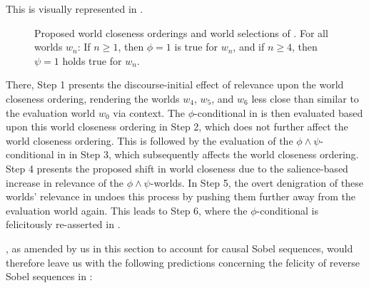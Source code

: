 This is visually represented in .
\noindent\begin{figure}[!htb]
\resizebox{!}{92mm}{}
\caption{Proposed world closeness orderings and world selections of . For all worlds $w_n$: If $n\geqslant1$, then $\phi=1$ is true for $w_n$, and if $n\geqslant 4$, then $\psi=1$ holds true for $w_n$.}
\end{figure}
There, Step 1 presents the discourse-initial effect of relevance upon the world closeness ordering, rendering the worlds $w_4$, $w_5$, and $w_6$ less close than similar to the evaluation world $w_0$ via context. The $\phi$-conditional in  is then evaluated based upon this world closeness ordering in Step 2, which does not further affect the world closeness ordering. This is followed by the evaluation of the $\phi\land\psi$-conditional in  in Step 3, which subsequently affects the world closeness ordering. Step 4 presents the proposed shift in world closeness due to the salience-based increase in relevance of the $\phi\land\psi$-worlds. In Step 5, the overt denigration of these worlds' relevance in  undoes this process by pushing them further away from the evaluation world again. This leads to Step 6, where the $\phi$-conditional is felicitously re-asserted in .


\textcite{Lewis2018}, as amended by us in this section to account for causal Sobel sequences, would therefore leave us with the following predictions concerning the felicity of reverse Sobel sequences in :
\begin{table}[!htb]
\caption{Predictions of \textcite{Lewis2018}, incorporating \textcite{Bennett2003} or \textcite{Arregui2009}, to distinguish between acausal Sobel sequences and causal Sobel sequences.}
\end{table}

